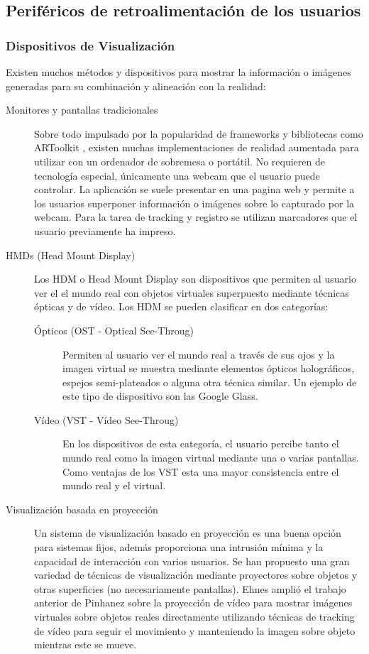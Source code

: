 \subsection{Periféricos de retroalimentación de los usuarios}
\subsubsection{Dispositivos  de Visualización}
Existen  muchos métodos y dispositivos para mostrar la información o imágenes generadas para su combinación y alineación con la realidad: 
\begin{description}
\item[Monitores y pantallas tradicionales]
  Sobre todo impulsado por la popularidad de frameworks y bibliotecas como ARToolkit \cite{Kato}, existen muchas implementaciones de realidad aumentada para utilizar con un ordenador de sobremesa o portátil. No requieren de tecnología especial, únicamente una webcam que el usuario puede controlar. La aplicación se suele presentar en una pagina web y permite a los usuarios superponer información o imágenes sobre lo capturado por la webcam. Para la tarea de tracking y registro se utilizan marcadores que el usuario previamente ha impreso.
  
\item[HMDs (Head Mount Display)] Los HDM o Head Mount Display son dispositivos que permiten al usuario ver el el mundo real con objetos virtuales superpuesto mediante técnicas ópticas y de vídeo. Los HDM se pueden clasificar en dos categorías:
 \begin{description}
\item[Ópticos (OST - Optical See-Throug)] Permiten al usuario ver el mundo real a través de sus ojos y la imagen virtual se muestra mediante elementos ópticos holográficos, espejos semi-plateados o alguna otra técnica similar. Un ejemplo de este tipo de dispositivo son las Google Glass.
    
  \item[Vídeo (VST - Vídeo See-Throug)] En los dispositivos de esta categoría, el usuario percibe tanto el mundo real como la imagen virtual mediante una o varias pantallas. Como ventajas de los VST esta una mayor consistencia entre el mundo real y el virtual.
  \end{description}
  
\item[Visualización basada en proyección]
 Un sistema de visualización basado en proyección es una buena opción para sistemas fijos, además proporciona una intrusión mínima y la capacidad de interacción con varios usuarios.
  Se han propuesto una gran variedad de técnicas de visualización mediante proyectores sobre objetos y otras superficies (no necesariamente pantallas). Ehnes \cite{Ehnes} amplió el trabajo anterior de Pinhanez \cite{Pinhanez} sobre la proyección de vídeo para mostrar imágenes virtuales sobre objetos reales directamente utilizando técnicas de tracking de vídeo para seguir el movimiento y manteniendo la imagen sobre objeto mientras este se mueve.
  

\end{description}
